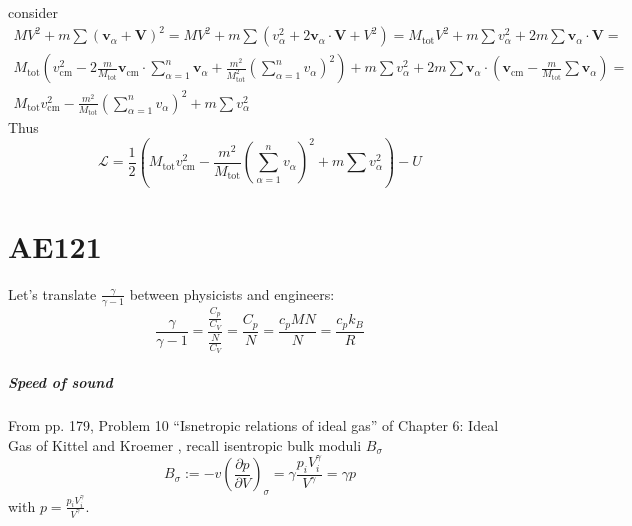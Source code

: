 \documentclass[10pt]{amsart}
\begin{document}
\begin{multicols*}{2}
consider 
\[
\begin{gathered}
 M V^2 + m \sum ( \mathbf{v}_{\alpha} + \mathbf{V})^2 = M V^2 + m \sum \left( v_{\alpha}^2 + 2 \mathbf{v}_{\alpha} \cdot \mathbf{V} + V^2 \right) = M_{\text{tot} } V^2 + m \sum v^2_{\alpha} + 2m \sum \mathbf{v}_{\alpha} \cdot \mathbf{V} = \\
 M_{\text{tot}} \left( v^2_{\text{cm}} - 2 \frac{m}{M_{\text{tot}}} \mathbf{v}_{\text{cm}} \cdot \sum_{\alpha = 1}^n \mathbf{v}_{\alpha} + \frac{ m^2}{  M_{\text{tot}}^2 }  \left( \sum_{\alpha = 1}^n v_{\alpha} \right)^2 \right) + m \sum v_{\alpha}^2 + 2m \sum \mathbf{v}_{\alpha} \cdot \left( \mathbf{v}_{\text{cm}} - \frac{m}{M_{\text{tot}} } \sum \mathbf{v}_{ \alpha} \right) = \\
 M_{\text{tot}} v^2_{\text{cm}}  - \frac{m^2}{ M_{\text{tot}}} \left(\sum_{\alpha =1}^n v_{\alpha} \right)^2 + m \sum v_{\alpha}^2 
\end{gathered}
\]	
Thus
\[
\mathcal{L} = \frac{1}{2} \left(  M_{\text{tot}} v^2_{\text{cm}}  - \frac{m^2}{ M_{\text{tot}}} \left(\sum_{\alpha =1}^n v_{\alpha} \right)^2 + m \sum v_{\alpha}^2  \right) - U
\]	
\part{AE121}


Let's translate $\frac{\gamma}{\gamma -1}$ between physicists and engineers:
\begin{equation}
  \boxed{ \frac{\gamma}{\gamma -1} = \frac{ \frac{C_p}{C_V}}{ \frac{N}{C_V}} = \frac{C_p}{N} = \frac{c_p MN}{N} = \frac{c_p k_B}{R} }
\end{equation}

\subsubsection{Speed of sound}

From pp. 179, Problem 10 ``Isnetropic relations of ideal gas'' of Chapter 6: Ideal Gas of Kittel and Kroemer \cite{CKittelHKroemer1980}, recall isentropic bulk moduli $B_{\sigma}$
\[
B_{\sigma} := -v\left( \frac{ \partial p}{ \partial V} \right)_{\sigma} = \gamma \frac{ p_i V_i^{\gamma } }{ V^{\gamma }} = \gamma p
\]
with $p = \frac{p_i V_i^{\gamma }}{ V^{\gamma}}$.  


\end{multicols*}
\end{document}
